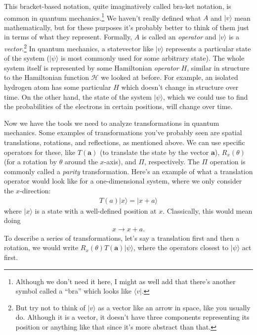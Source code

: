 This bracket-based notation, quite imaginatively called bra-ket notation, is common in quantum mechanics.\footnote{Although we don't need it here, I might as well add that there's another symbol called a ``bra'' which looks like $\langle v|$.} We haven't really defined what $A$ and $|v\rangle$ mean mathematically, but for these purposes it's probably better to think of them just in terms of what they represent. Formally, $A$ is called an \emph{operator} and $|v\rangle$ is a \emph{vector}.\footnote{But try not to think of $|v\rangle$ as a vector like an arrow in space, like you usually do. Although it is a vector, it doesn't have three components representing its position or anything like that since it's more abstract than that.} In quantum mechanics, a statevector like $|v\rangle$ represents a particular state of the system ($|\psi\rangle$ is most commonly used for some arbitrary state). The whole system itself is represented by some Hamiltonian \emph{operator} $H$, similar in structure to the Hamiltonian function $\mathscr{H}$ we looked at before. For example, an isolated hydrogen atom has some particular $H$ which doesn't change in structure over time. On the other hand, the state of the system $|\psi\rangle$, which we could use to find the probabilities of the electrons in certain positions, will change over time.

Now we have the tools we need to analyze transformations in quantum mechanics. Some examples of transformations you've probably seen are spatial translations, rotations, and reflections, as mentioned above. We can use specific operators for these, like $T(\mathbf{a})$ (to translate the state by the vector $\mathbf{a}$), $R_x(\theta)$ (for a rotation by $\theta$ around the $x$-axis), and $\Pi$, respectively. The $\Pi$ operation is commonly called a \emph{parity} transformation. Here's an example of what a translation operator would look like for a one-dimensional system, where we only consider the $x$-direction:
\begin{align*}
    T(a)|x\rangle = |x+a\rangle
\end{align*}
where $|x\rangle$ is a state with a well-defined position at $x$. Classically, this would mean doing
\begin{align*}
    x \rightarrow x+a.
\end{align*}
To describe a series of transformations, let's say a translation first and then a rotation, we would write $R_x(\theta)T(\mathbf{a})|\psi\rangle$, where the operators closest to $|\psi\rangle$ act first.

